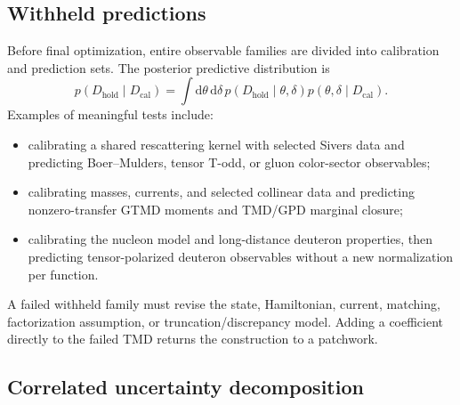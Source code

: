 \documentclass[11pt]{article}
\newcommand{\dd}{\mathrm{d}}
\begin{document}
\subsection{Withheld predictions}

Before final optimization, entire observable families are divided into
calibration and prediction sets.  The posterior predictive distribution is
\begin{equation}
 p(D_{\mathrm{hold}}\mid D_{\mathrm{cal}})
 =\int\dd\theta\,\dd\delta\,
 p(D_{\mathrm{hold}}\mid\theta,\delta)
 p(\theta,\delta\mid D_{\mathrm{cal}}).
\label{eq:posterior-predictive}
\end{equation}
Examples of meaningful tests include:
\begin{itemize}
\item calibrating a shared rescattering kernel with selected Sivers data and
predicting Boer--Mulders, tensor T-odd, or gluon color-sector observables;
\item calibrating masses, currents, and selected collinear data and predicting
nonzero-transfer GTMD moments and TMD/GPD marginal closure;
\item calibrating the nucleon model and long-distance deuteron properties,
then predicting tensor-polarized deuteron observables without a new
normalization per function.
\end{itemize}

A failed withheld family must revise the state, Hamiltonian, current,
matching, factorization assumption, or truncation/discrepancy model.  Adding a
coefficient directly to the failed TMD returns the construction to a
patchwork.

\subsection{Correlated uncertainty decomposition}
\end{document}
